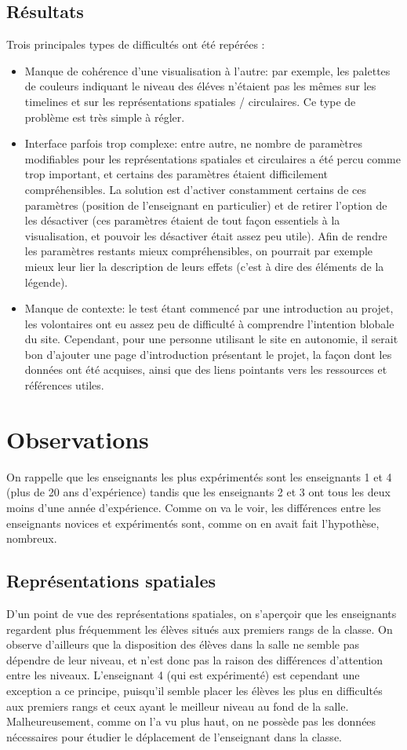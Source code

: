 \documentclass{article}
\begin{document}
\subsection{Résultats}
Trois principales types de difficultés ont été repérées :
\begin{itemize}
    \item Manque de cohérence d'une visualisation à l'autre: par exemple, les palettes de couleurs indiquant le niveau des éléves n'étaient pas les mêmes sur les timelines et sur les représentations spatiales / circulaires. Ce type de problème est très simple à régler.
    \item Interface parfois trop complexe: entre autre, ne nombre de paramètres modifiables pour les représentations spatiales et circulaires a été percu comme trop important, et certains des paramètres étaient difficilement compréhensibles. La solution est d'activer constamment certains de ces paramètres (position de l'enseignant en particulier) et de retirer l'option de les désactiver (ces paramètres étaient de tout façon essentiels à la visualisation, et pouvoir les désactiver était assez peu utile). Afin de rendre les paramètres restants mieux compréhensibles, on pourrait par exemple mieux leur lier la description de leurs effets (c'est à dire des éléments de la légende).
    \item Manque de contexte: le test étant commencé par une introduction au projet, les volontaires ont eu assez peu de difficulté à comprendre l'intention blobale du site. Cependant, pour une personne utilisant le site en autonomie, il serait bon d'ajouter une page d'introduction présentant le projet, la façon dont les données ont été acquises, ainsi que des liens pointants vers les ressources et références utiles.
\end{itemize}

\section{Observations}
On rappelle que les enseignants les plus expérimentés sont les enseignants 1 et 4 (plus de 20 ans d'expérience) tandis que les enseignants 2 et 3 ont tous les deux moins d'une année d'expérience. Comme on va le voir, les différences entre les enseignants novices et expérimentés sont, comme on en avait fait l'hypothèse, nombreux.
\subsection{Représentations spatiales}
D'un point de vue des représentations spatiales, on s'aperçoir que les enseignants regardent plus fréquemment les élèves situés aux premiers rangs de la classe. On observe d'ailleurs que la disposition des élèves dans la salle ne semble pas dépendre de leur niveau, et n'est donc pas la raison des différences d'attention entre les niveaux. L'enseignant 4 (qui est expérimenté) est cependant une exception a ce principe, puisqu'il semble placer les élèves les plus en difficultés aux premiers rangs et ceux ayant le meilleur niveau au fond de la salle.\\
Malheureusement, comme on l'a vu plus haut, on ne possède pas les données nécessaires pour étudier le déplacement de l'enseignant dans la classe.
\end{document}
